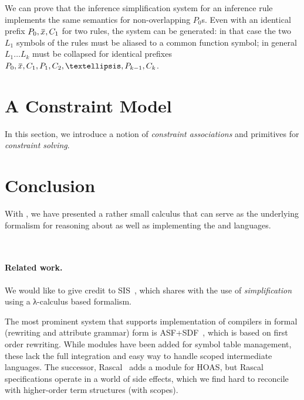\documentclass[letterpaper,11pt]{article}
\begin{document}
\begin{example}
\end{example}

We can prove that the inference simplification system for an inference rule implements the same
semantics for non-overlapping $P_0$s. Even with an identical prefix $P_0,\ov{x},C_1$ for two rules,
the system can be generated: in that case the two $L_1$ symbols of the rules must be aliased to a
common function symbol; in general $L_1…L_k$ must be collapsed for identical prefixes
$P_0,\ov{x},C_1,P_1, C_2,…,P_{k-1}, C_k$. 


\section{A Constraint Model}
\label{sec:constraints}

In this section, we introduce a notion of \emph{constraint associations} and primitives for
\emph{constraint solving}.



\section{Conclusion}
\label{sec:conc}

With \hax, we have presented a rather small calculus that can serve as the underlying formalism for
reasoning about as well as implementing the \CRSX and \HAX languages.


~\cite{Knuth:mst1968} 
~\cite{Aho+:2006}


\paragraph*{Related work.}

We would like to give credit to SIS~\cite{Mosses:daimi1979}, which shares with \hax the use of
\emph{simplification} using a λ-calculus based formalism.

The most prominent system that supports implementation of compilers in formal (rewriting and
attribute grammar) form is ASF+SDF~\cite{Brand+:toplas2002}, which is based on first order
rewriting. While modules have been added for symbol table management, these lack the full
integration and easy way to handle scoped intermediate languages. The successor,
Rascal~\cite{Bos+:eptcs2011} adds a module for HOAS, but Rascal specifications operate in a world of
side effects, which we find hard to reconcile with higher-order term structures (with scopes).
\end{document}
